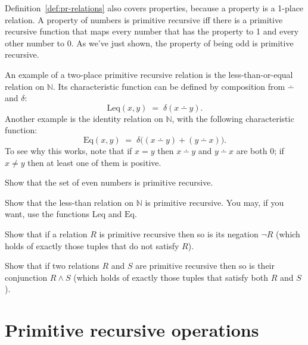 Definition~\ref{def:pr-relations} also covers properties,
because a property is a 1-place relation.
A property of numbers is primitive recursive iff
there is a primitive recursive function that maps every number that has the property to 1 and every other number to 0.
As we've just shown, the property of being odd is primitive recursive.

An example of a two-place primitive recursive relation is the less-than-or-equal relation on $\mathbb{N}$.
Its characteristic function can be defined by composition from $\dotminus$ and $\delta$:
\[
\mathrm{Leq}(x,y) \;=\; \delta(x\dotminus y).
\]
Another example is the identity relation on $\mathbb{N}$,
with the following characteristic function:
\[
\mathrm{Eq}(x,y) \;=\; \delta\big((x\dotminus y)+(y\dotminus x)\big).
\]
To see why this works,
note that if $x=y$ then $x\dotminus y$ and $y\dotminus x$ are both 0;
if $x\ne y$ then at least one of them is positive.

\begin{exercise}
  Show that the set of even numbers is primitive recursive.
\end{exercise}

\begin{exercise}
  Show that the less-than relation on $\mathbb{N}$ is primitive recursive.
  You may, if you want, use the functions $\mathrm{Leq}$ and $\mathrm{Eq}$.
\end{exercise}

\begin{exercise}\label{ex:pr-negation}
  Show that if a relation $R$ is primitive recursive then so is its negation $\neg R$
  (which holds of exactly those tuples that do not satisfy $R$).
\end{exercise}

\begin{exercise}\label{ex:pr-conjunction}
  Show that if two relations $R$ and $S$ are primitive recursive then so is their conjunction $R \land S$ (which holds of exactly those tuples that satisfy both $R$ and $S$).
\end{exercise}

\section{Primitive recursive operations}\label{sec:pr-examples}

